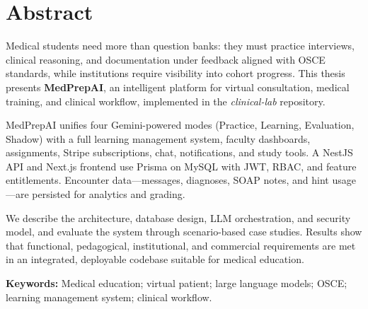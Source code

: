\chapter*{Abstract}

Medical students need more than question banks: they must practice interviews, clinical reasoning, and documentation under feedback aligned with OSCE standards, while institutions require visibility into cohort progress. This thesis presents \textbf{MedPrepAI}, an intelligent platform for virtual consultation, medical training, and clinical workflow, implemented in the \emph{clinical-lab} repository.

MedPrepAI unifies four Gemini-powered modes (Practice, Learning, Evaluation, Shadow) with a full learning management system, faculty dashboards, assignments, Stripe subscriptions, chat, notifications, and study tools. A NestJS API and Next.js frontend use Prisma on MySQL with JWT, RBAC, and feature entitlements. Encounter data---messages, diagnoses, SOAP notes, and hint usage---are persisted for analytics and grading.

We describe the architecture, database design, LLM orchestration, and security model, and evaluate the system through scenario-based case studies. Results show that functional, pedagogical, institutional, and commercial requirements are met in an integrated, deployable codebase suitable for medical education.

\vspace{1em}
\noindent\textbf{Keywords:} Medical education; virtual patient; large language models; OSCE; learning management system; clinical workflow.

\clearpage
